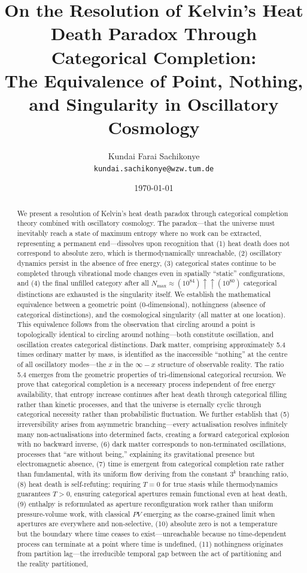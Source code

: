 \documentclass[12pt,a4paper]{article}
\title{\textbf{On the Resolution of Kelvin's Heat Death Paradox Through Categorical Completion: \\[0.3em] The Equivalence of Point, Nothing, and Singularity in Oscillatory Cosmology}}
\author{
Kundai Farai Sachikonye\\
\texttt{kundai.sachikonye@wzw.tum.de}
}
\date{\today}
\theoremstyle{definition}
\theoremstyle{remark}
\newcommand{\Nmax}{N_{\text{max}}}
\begin{document}
\maketitle

\begin{abstract}
We present a resolution of Kelvin's heat death paradox through categorical completion theory combined with oscillatory cosmology. The paradox---that the universe must inevitably reach a state of maximum entropy where no work can be extracted, representing a permanent end---dissolves upon recognition that (1) heat death does not correspond to absolute zero, which is thermodynamically unreachable, (2) oscillatory dynamics persist in the absence of free energy, (3) categorical states continue to be completed through vibrational mode changes even in spatially ``static'' configurations, and (4) the final unfilled category after all $\Nmax \approx (10^{84}) \uparrow\uparrow (10^{80})$ categorical distinctions are exhausted is the singularity itself. We establish the mathematical equivalence between a geometric point (0-dimensional), nothingness (absence of categorical distinctions), and the cosmological singularity (all matter at one location). This equivalence follows from the observation that circling around a point is topologically identical to circling around nothing---both constitute oscillation, and oscillation creates categorical distinctions. Dark matter, comprising approximately 5.4 times ordinary matter by mass, is identified as the inaccessible ``nothing'' at the centre of all oscillatory modes---the $x$ in the $\infty - x$ structure of observable reality. The ratio 5.4 emerges from the geometric properties of tri-dimensional categorical recursion. We prove that categorical completion is a necessary process independent of free energy availability, that entropy increase continues after heat death through categorical filling rather than kinetic processes, and that the universe is eternally cyclic through categorical necessity rather than probabilistic fluctuation. We further establish that (5) irreversibility arises from asymmetric branching---every actualisation resolves infinitely many non-actualisations into determined facts, creating a forward categorical explosion with no backward inverse, (6) dark matter corresponds to non-terminated oscillations, processes that ``are without being,'' explaining its gravitational presence but electromagnetic absence, (7) time is emergent from categorical completion rate rather than fundamental, with its uniform flow deriving from the constant $3^k$ branching ratio, (8) heat death is self-refuting: requiring $T = 0$ for true stasis while thermodynamics guarantees $T > 0$, ensuring categorical apertures remain functional even at heat death, (9) enthalpy is reformulated as aperture reconfiguration work rather than uniform pressure-volume work, with classical $PV$ emerging as the coarse-grained limit when apertures are everywhere and non-selective, (10) absolute zero is not a temperature but the boundary where time ceases to exist---unreachable because no time-dependent process can terminate at a point where time is undefined, (11) nothingness originates from partition lag---the irreducible temporal gap between the act of partitioning and the reality partitioned, 
\end{abstract}
\end{document}
